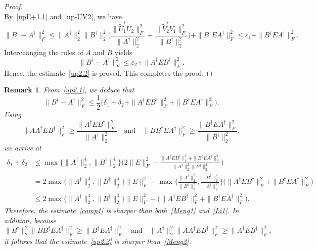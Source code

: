 \documentclass[11pt]{article}
\newtheorem{remark}{Remark}[section]
\begin{document}
\begin{proof}
\begin{equation}
\end{equation}
By~\eqref{upE+1.1} and~\eqref{up-UV2}, we have
\begin{displaymath}
\|B^{\dagger}-A^{\dagger}\|_{F}^{2}\leq\|A^{\dagger}\|_{2}^{2}\|B^{\dagger}\|_{2}^{2}\bigg(\frac{\|\widetilde{U}_{1}^{\ast}U_{2}\|_{F}^{2}}{\|A^{\dagger}\|_{2}^{2}}+\frac{\|\widetilde{V}_{2}^{\ast}V_{1}\|_{F}^{2}}{\|B^{\dagger}\|_{2}^{2}}\bigg)+\|B^{\dagger}EA^{\dagger}\|_{F}^{2}\leq\varepsilon_{1}+\|B^{\dagger}EA^{\dagger}\|_{F}^{2}.
\end{displaymath}
Interchanging the roles of $A$ and $B$ yields
\begin{displaymath}
\|B^{\dagger}-A^{\dagger}\|_{F}^{2}\leq\varepsilon_{2}+\|A^{\dagger}EB^{\dagger}\|_{F}^{2}.
\end{displaymath}
Hence, the estimate~\eqref{up2.2} is proved. This completes the proof.
\end{proof}

\begin{remark}\rm
From~\eqref{up2.1}, we deduce that
\begin{equation}\label{comp1}
\|B^{\dagger}-A^{\dagger}\|_{F}^{2}\leq\frac{1}{2}\big(\delta_{1}+\delta_{2}+\|A^{\dagger}EB^{\dagger}\|_{F}^{2}+\|B^{\dagger}EA^{\dagger}\|_{F}^{2}\big).
\end{equation}
Using
\begin{displaymath} \|AA^{\dagger}EB^{\dagger}\|_{F}^{2}\geq\frac{\|A^{\dagger}EB^{\dagger}\|_{F}^{2}}{\|A^{\dagger}\|_{2}^{2}} \quad \text{and} \quad \|BB^{\dagger}EA^{\dagger}\|_{F}^{2}\geq\frac{\|B^{\dagger}EA^{\dagger}\|_{F}^{2}}{\|B^{\dagger}\|_{2}^{2}},
\end{displaymath}
we arrive at
\begin{align*}
\delta_{1}+\delta_{2}&\leq\max\big\{\|A^{\dagger}\|_{2}^{4},\|B^{\dagger}\|_{2}^{4}\big\}\bigg(2\|E\|_{F}^{2}-\frac{\|A^{\dagger}EB^{\dagger}\|_{F}^{2}+\|B^{\dagger}EA^{\dagger}\|_{F}^{2}}{\|A^{\dagger}\|_{2}^{2}\|B^{\dagger}\|_{2}^{2}}\bigg)\\
&=2\max\big\{\|A^{\dagger}\|_{2}^{4},\|B^{\dagger}\|_{2}^{4}\big\}\|E\|_{F}^{2}-\max\bigg\{\frac{\|A^{\dagger}\|_{2}^{2}}{\|B^{\dagger}\|_{2}^{2}},\frac{\|B^{\dagger}\|_{2}^{2}}{\|A^{\dagger}\|_{2}^{2}}\bigg\}\big(\|A^{\dagger}EB^{\dagger}\|_{F}^{2}+\|B^{\dagger}EA^{\dagger}\|_{F}^{2}\big)\\
&\leq 2\max\big\{\|A^{\dagger}\|_{2}^{4},\|B^{\dagger}\|_{2}^{4}\big\}\|E\|_{F}^{2}-\big(\|A^{\dagger}EB^{\dagger}\|_{F}^{2}+\|B^{\dagger}EA^{\dagger}\|_{F}^{2}\big).
\end{align*}
Therefore, the estimate~\eqref{comp1} is sharper than both~\eqref{Meng1} and~\eqref{Li1}. In addition, because
\begin{displaymath}
\|B^{\dagger}\|_{2}^{2}\|BB^{\dagger}EA^{\dagger}\|_{F}^{2}\geq\|B^{\dagger}EA^{\dagger}\|_{F}^{2} \quad \text{and} \quad \|A^{\dagger}\|_{2}^{2}\|AA^{\dagger}EB^{\dagger}\|_{F}^{2}\geq\|A^{\dagger}EB^{\dagger}\|_{F}^{2},
\end{displaymath}
it follows that the estimate~\eqref{up2.2} is sharper than~\eqref{Meng2}.
\end{remark}
\end{document}
